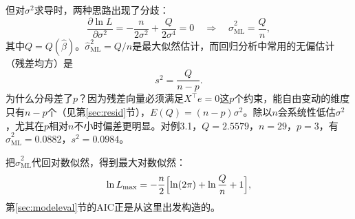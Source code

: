 但对$\sigma^2$求导时，两种思路出现了分歧：
\[
\frac{\partial\ln L}{\partial\sigma^2}=-\frac{n}{2\sigma^2}+\frac{Q}{2\sigma^4}=0
\quad\Longrightarrow\quad
\widehat\sigma^2_{\mathrm{ML}}=\frac Qn,
\]
其中$Q=Q(\widehat\beta)$。$\widehat\sigma^2_{\mathrm{ML}}=Q/n$是最大似然估计，而回归分析中常用的无偏估计（残差均方）是
\[
s^2=\frac{Q}{n-p}.
\]
为什么分母差了$p$？因为残差向量必须满足$X^\top e=0$这$p$个约束，能自由变动的维度只有$n-p$个（见第\ref{sec:resid}节），$E(Q)=(n-p)\sigma^2$。除以$n$会系统性低估$\sigma^2$，尤其在$p$相对$n$不小时偏差更明显。对例3.1，$Q=2.5579$，$n=29$，$p=3$，有$\widehat\sigma^2_{\mathrm{ML}}=0.0882$，$s^2=0.0984$。

把$\widehat\sigma^2_{\mathrm{ML}}$代回对数似然，得到最大对数似然：
\[
\ln L_{\max}=-\frac n2\Bigl[\ln(2\pi)+\ln\frac Qn+1\Bigr],
\]
第\ref{sec:modeleval}节的AIC正是从这里出发构造的。

